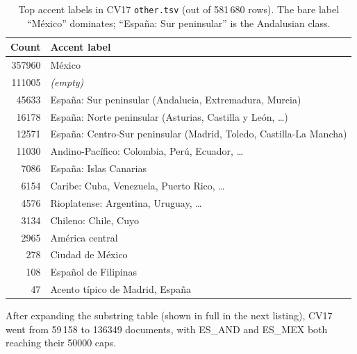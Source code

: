\documentclass[11pt,a4paper]{article}
\begin{document}
\begin{table}[h]
\centering\small
\begin{tabular}{r l}
\toprule
\textbf{Count} & \textbf{Accent label} \\
\midrule
\num{357960} & México \\
\num{111005} & \textit{(empty)} \\
\num{45633}  & España: Sur peninsular (Andalucia, Extremadura, Murcia) \\
\num{16178}  & España: Norte peninsular (Asturias, Castilla y León, \ldots) \\
\num{12571}  & España: Centro-Sur peninsular (Madrid, Toledo, Castilla-La Mancha) \\
\num{11030}  & Andino-Pacífico: Colombia, Perú, Ecuador, \ldots \\
\num{7086}   & España: Islas Canarias \\
\num{6154}   & Caribe: Cuba, Venezuela, Puerto Rico, \ldots \\
\num{4576}   & Rioplatense: Argentina, Uruguay, \ldots \\
\num{3134}   & Chileno: Chile, Cuyo \\
\num{2965}   & América central \\
\num{278}    & Ciudad de México \\
\num{108}    & Español de Filipinas \\
\num{47}     & Acento típico de Madrid, España \\
\bottomrule
\end{tabular}
\caption{Top accent labels in CV17 \texttt{other.tsv} (out of 581\,680
rows). The bare label ``México'' dominates; ``España: Sur peninsular''
is the Andalusian class.}
\label{tab:cv17-accents}
\end{table}

After expanding the substring table (shown in full in the next listing),
CV17 went from 59\,158 to \num{136349} documents, with ES\_AND and
ES\_MEX both reaching their \num{50000} caps.
\end{document}
